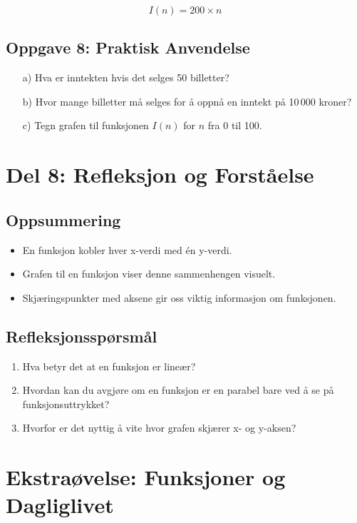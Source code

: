 \documentclass[12pt]{article}
\begin{document}
\[
I(n) = 200 \times n
\]

\subsection*{Oppgave 8: Praktisk Anvendelse}

\begin{enumerate}
    \item[a)] Hva er inntekten hvis det selges 50 billetter?
    \item[b)] Hvor mange billetter må selges for å oppnå en inntekt på 10\,000 kroner?
    \item[c)] Tegn grafen til funksjonen \( I(n) \) for \( n \) fra 0 til 100.
\end{enumerate}

\section*{Del 8: Refleksjon og Forståelse}

\subsection*{Oppsummering}

\begin{itemize}
    \item En funksjon kobler hver x-verdi med én y-verdi.
    \item Grafen til en funksjon viser denne sammenhengen visuelt.
    \item Skjæringspunkter med aksene gir oss viktig informasjon om funksjonen.
\end{itemize}

\subsection*{Refleksjonsspørsmål}

\begin{enumerate}
    \item Hva betyr det at en funksjon er lineær?
    \item Hvordan kan du avgjøre om en funksjon er en parabel bare ved å se på funksjonsuttrykket?
    \item Hvorfor er det nyttig å vite hvor grafen skjærer x- og y-aksen?
\end{enumerate}

\section*{Ekstraøvelse: Funksjoner og Dagliglivet}
\end{document}
